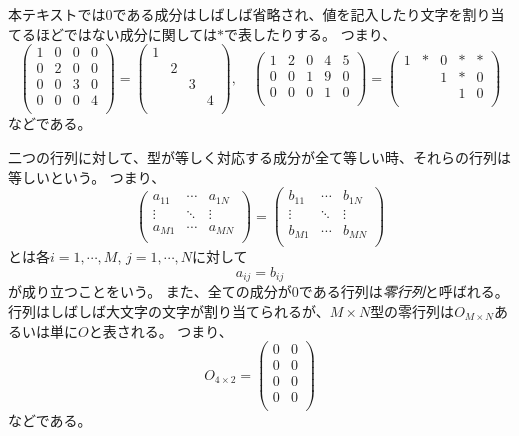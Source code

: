 本テキストでは$0$である成分はしばしば省略され、値を記入したり文字を割り当てるほどではない成分に関しては$*$で表したりする。
つまり、
$$
\begin{pmatrix}
1 & 0 & 0 & 0 \\
0 & 2 & 0 & 0 \\
0 & 0 & 3 & 0 \\
0 & 0 & 0 & 4 \\
\end{pmatrix}
=
\begin{pmatrix}
1 & & & \\
& 2 & & \\
& & 3 & \\
& & & 4 \\
\end{pmatrix},
\quad
\begin{pmatrix}
1 & 2 & 0 & 4 & 5 \\
0 & 0 & 1 & 9 & 0 \\
0 & 0 & 0 & 1 & 0 \\
\end{pmatrix}
=
\begin{pmatrix}
1 & * & 0 & * & * \\
& & 1 & * & 0 \\
& & & 1 & 0 \\
\end{pmatrix}
$$
などである。

二つの行列に対して、型が等しく対応する成分が全て等しい時、それらの行列は等しいという。
つまり、
$$
\begin{pmatrix}
a_{1 1} & \cdots & a_{1 N} \\
\vdots & \ddots & \vdots \\
a_{M 1} & \cdots & a_{M N} \\
\end{pmatrix}
=
\begin{pmatrix}
b_{1 1} & \cdots & b_{1 N} \\
\vdots & \ddots & \vdots \\
b_{M 1} & \cdots & b_{M N} \\
\end{pmatrix}
$$
とは各$i = 1, \cdots, M$, $j = 1, \cdots, N$に対して
$$
a_{i j} = b_{i j}
$$
が成り立つことをいう。
また、全ての成分が$0$である行列は\emph{零行列}と呼ばれる。
行列はしばしば大文字の文字が割り当てられるが、$M\times N$型の零行列は$O_{M\times N}$あるいは単に$O$と表される。
つまり、
$$
O_{4\times 2} =
\begin{pmatrix}
0 & 0 \\
0 & 0 \\
0 & 0 \\
0 & 0 \\
\end{pmatrix}
$$
などである。

